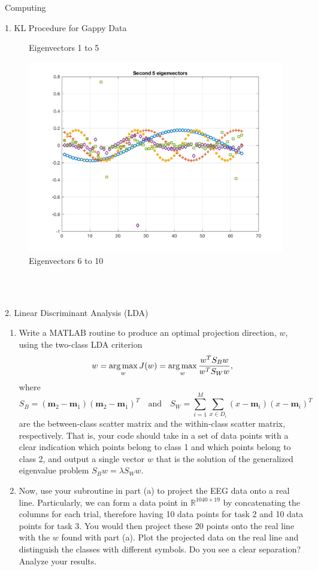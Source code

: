 \begin{section}{Computing}
\begin{homeworkSection}{1. KL Procedure for Gappy Data}
{\begin{minipage}{1.0\textwidth}
\begin{figure}[H]
        \caption{Eigenvectors 1 to 5}
        \label{fig:eigvec_1}
        \end{figure}
    \end{minipage}
    \begin{minipage}{1.0\textwidth}
        \begin{figure}[H]
        \centering
        \includegraphics[trim={0cm 0cm 0cm 0cm},clip,width=0.60\columnwidth]{../data/eigvec_2}
        \caption{Eigenvectors 6 to 10}
        \label{fig:eigvec_2}
        \end{figure}
    \end{minipage}
    \\
    \\
}
\end{homeworkSection}

\newpage
\begin{homeworkSection}{2. Linear Discriminant Analysis (LDA)}
\renewcommand{\theenumi}{\alph{enumi}}
\begin{enumerate}
  \item Write a \textsc{MATLAB} routine to produce an optimal projection direction, $w$, using the two-class LDA
    criterion
    $$
        w = \operatorname*{arg\,max}_w J(w) = \operatorname*{arg\,max}_w \frac{w^T S_B w}{w^T S_W w},
    $$
    where
    $$
        S_B = (\bm{m}_2 - \bm{m}_1)(\bm{m}_2 - \bm{m}_1)^T \quad \text{and} \quad
        S_W = \sum_{i=1}^M \sum_{x \in D_i} (x - \bm{m}_i)(x - \bm{m}_i)^T
    $$
    are the between-class scatter matrix and the within-class scatter matrix, respectively. That is, your
    code should take in a set of data points with a clear indication which points belong to class 1 and
    which points belong to class 2, and output a single vector $w$ that is the solution of the generalized
    eigenvalue problem $S_B w = \lambda S_W w$.
  \item Now, use your subroutine in part (a) to project the EEG data onto a real line. Particularly, we can
    form a data point in $\mathbb{R}^{1040 \times 19}$ by concatenating the columns for each trial, therefore having 10 data
    points for task 2 and 10 data points for task 3. You would then project these 20 points onto the
    real line with the $w$ found with part (a). Plot the projected data on the real line and distinguish the
    classes with different symbols. Do you see a clear separation? Analyze your results.
\end{enumerate}


\end{homeworkSection}
\end{section}
